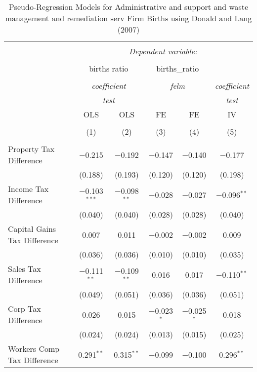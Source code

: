 
\begin{table}[!htbp] \centering 
  \caption{Pseudo-Regression Models for  Administrative and support and waste management and remediation serv Firm Births using Donald and Lang (2007)} 
  \label{} 
\begin{tabular}{@{\extracolsep{5pt}}lccccc} 
\\[-1.8ex]\hline 
\hline \\[-1.8ex] 
 & \multicolumn{5}{c}{\textit{Dependent variable:}} \\ 
\cline{2-6} 
\\[-1.8ex] & \multicolumn{2}{c}{births ratio} & \multicolumn{2}{c}{births\_ratio} &   \\ 
\\[-1.8ex] & \multicolumn{2}{c}{\textit{coefficient}} & \multicolumn{2}{c}{\textit{felm}} & \textit{coefficient} \\ 
 & \multicolumn{2}{c}{\textit{test}} & \multicolumn{2}{c}{\textit{}} & \textit{test} \\ 
 & OLS & OLS & FE & FE & IV \\ 
\\[-1.8ex] & (1) & (2) & (3) & (4) & (5)\\ 
\hline \\[-1.8ex] 
 Property Tax Difference & $-$0.215 & $-$0.192 & $-$0.147 & $-$0.140 & $-$0.177 \\ 
  & (0.188) & (0.193) & (0.120) & (0.120) & (0.198) \\ 
  Income Tax Difference & $-$0.103$^{***}$ & $-$0.098$^{**}$ & $-$0.028 & $-$0.027 & $-$0.096$^{**}$ \\ 
  & (0.040) & (0.040) & (0.028) & (0.028) & (0.040) \\ 
  Capital Gains Tax Difference & 0.007 & 0.011 & $-$0.002 & $-$0.002 & 0.009 \\ 
  & (0.036) & (0.036) & (0.010) & (0.010) & (0.035) \\ 
  Sales Tax Difference & $-$0.111$^{**}$ & $-$0.109$^{**}$ & 0.016 & 0.017 & $-$0.110$^{**}$ \\ 
  & (0.049) & (0.051) & (0.036) & (0.036) & (0.051) \\ 
  Corp Tax Difference & 0.026 & 0.015 & $-$0.023$^{*}$ & $-$0.025$^{*}$ & 0.018 \\ 
  & (0.024) & (0.024) & (0.013) & (0.015) & (0.025) \\ 
  Workers Comp Tax Difference & 0.291$^{**}$ & 0.315$^{**}$ & $-$0.099 & $-$0.100 & 0.296$^{**}$ \\ 

\end{tabular}
\end{table}
